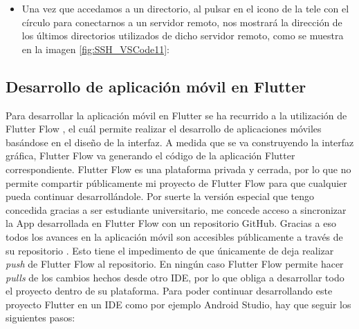 \begin{itemize}
            \\ 
            \item Una vez que accedamos a un directorio, al pulsar en el icono de la tele con el círculo para conectarnos a un servidor remoto, nos mostrará la dirección de los últimos directorios utilizados de dicho servidor remoto, como se muestra en la imagen \ref{fig:SSH_VSCode11}:
            \\ 
        \end{itemize}

    \subsection{Desarrollo de aplicación móvil en Flutter}
    Para desarrollar la aplicación móvil en Flutter \cite{wiki:flutter} se ha recurrido a la utilización de Flutter Flow \cite{wiki:flutter_flow}, el cuál permite realizar el desarrollo de aplicaciones móviles basándose en el diseño de la interfaz. A medida que se va construyendo la interfaz gráfica, Flutter Flow va generando el código de la aplicación Flutter correspondiente. 
    Flutter Flow es una plataforma privada y cerrada, por lo que no permite compartir públicamente mi proyecto de Flutter Flow para que cualquier pueda continuar desarrollándole. Por suerte la versión especial que tengo concedida gracias a ser estudiante universitario, me concede acceso a sincronizar la App desarrollada en Flutter Flow con un repositorio GitHub. Gracias a eso todos los avances en la aplicación móvil son accesibles públicamente a través de su repositorio \cite{GreenInHouse:repo:AppMovil}. Esto tiene el impedimento de que únicamente de deja realizar \textit{push} de Flutter Flow al repositorio. En ningún caso Flutter Flow permite hacer \textit{pulls} de los cambios hechos desde otro IDE, por lo que obliga a desarrollar todo el proyecto dentro de su plataforma.
    Para poder continuar desarrollando este proyecto Flutter en un IDE como por ejemplo Android Studio, hay que seguir los siguientes pasos:
